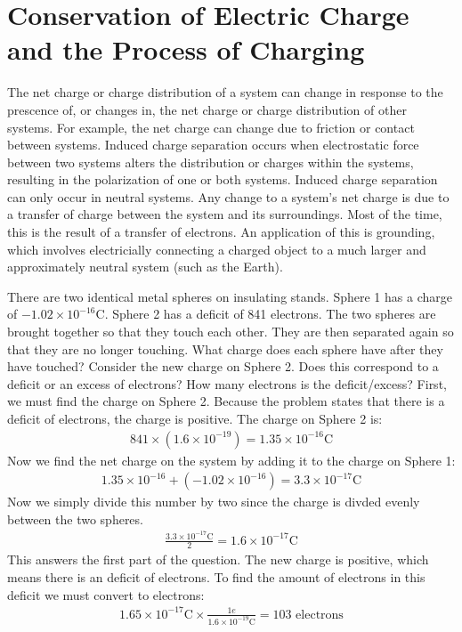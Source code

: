 \documentclass[../em.tex]{subfiles}
\begin{document}
\section{Conservation of Electric Charge and the Process of Charging}
The net charge or charge distribution of a system can change in response to the prescence of, or changes in, the net charge or charge distribution of other systems. For example, the net charge can change due to friction or contact between systems.
\smallbreak
Induced charge separation occurs when electrostatic force between two systems alters the distribution or charges within the systems, resulting in the polarization of one or both systems. Induced charge separation can only occur in neutral systems.
\smallbreak
Any change to a system's net charge is due to a transfer of charge between the system and its surroundings. Most of the time, this is the result of a transfer of electrons.
\smallbreak
An application of this is grounding, which involves electricially connecting a charged object to a much larger and approximately neutral system (such as the Earth).
\begin{example}
    There are two identical metal spheres on insulating stands. Sphere 1 has a charge of $-1.02 \times 10^{-16}$C. Sphere 2 has a deficit of 841 electrons. The two spheres are brought together so that they touch each other. They are then separated again so that they are no longer touching. What charge does each sphere have after they have touched? Consider the new charge on Sphere 2. Does this correspond to a deficit or an excess of electrons? How many electrons is the deficit/excess?
    \smallbreak
    First, we must find the charge on Sphere 2. Because the problem states that there is a deficit of electrons, the charge is positive.
    The charge on Sphere 2 is:
    \begin{align*}
        841 \times (1.6\times 10^{-19}) = 1.35\times 10^{-16}\text{C}
    \end{align*}
    Now we find the net charge on the system by adding it to the charge on Sphere 1:
    \begin{align*}
        1.35 \times 10^{-16} + (-1.02 \times 10^{-16}) = 3.3\times 10^{-17}\text{C}
    \end{align*}
    Now we simply divide this number by two since the charge is divded evenly between the two spheres.
    \begin{align*}
        \frac{3.3\times 10^{-17}\text{C}}{2}=1.6\times 10^{-17}\text{C}    
    \end{align*}
    This answers the first part of the question.
    \smallbreak
    The new charge is positive, which means there is an deficit of electrons. To find the amount of electrons in this deficit we must convert to electrons:
    \begin{align*}
    1.65\times10^{-17}\text{C}\times \frac{1e}{1.6\times10^{-19}\text{C}}=103\text{ electrons}
    \end{align*} 

\end{example}
\end{document}
